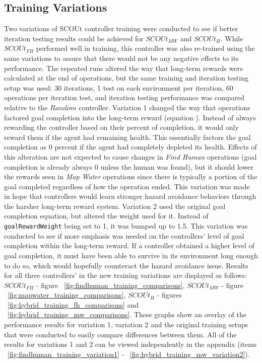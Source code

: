 \subsection{Training Variations} \label{subsec:training_variations}
Two variations of SCOUt controller training were conducted to see if better iteration testing results could be achieved for $SCOUt_{MW}$ and $SCOUt_{H}$.
While $SCOUt_{FH}$ performed well in training, this controller was also re-trained using the same variations to assure that there would not be any negative effects to its performance.
The repeated runs altered the way that long-term rewards were calculated at the end of operations, but the same training and iteration testing setup was used: 30 iterations, 1 test on each environment per iteration, 60 operations per iteration test, and iteration testing performance was compared relative to the $Random$ controller.
Variation 1 changed the way that operations factored goal completion into the long-term reward (equation ).
Instead of always rewarding the controller based on their percent of completion, it would only reward them if the agent had remaining health.
This essentially factors the goal completion as 0 percent if the agent had completely depleted its health.
Effects of this alteration are not expected to cause changes in \textit{Find Human} operations (goal completion is already always 0 unless the human was found), but it should lower the rewards seen in \textit{Map Water} operations since there is typically a portion of the goal completed regardless of how the operation ended.
This variation was made in hope that controllers would learn stronger hazard avoidance behaviors through the harsher long-term reward system.
Variation 2 used the original goal completion equation, but altered the weight used for it.
Instead of \texttt{goalRewardWeight} being set to 1, it was bumped up to 1.5.
This variation was conducted to see if more emphasis was needed on the controllers' level of goal completion within the long-term reward.
If a controller obtained a higher level of goal completion, it must have been able to survive in its environment long enough to do so, which would hopefully counteract the hazard avoidance issue.
Results for all three controllers' in the new training variations are displayed as follows: $SCOUt_{FH}$ - figure ~\ref{fig:findhuman_training_comparisons}, $SCOUt_{MW}$ - figure ~\ref{fig:mapwater_training_comparisons}, $SCOUt_{H}$ - figures ~\ref{fig:hybrid_training_fh_comparisons} and ~\ref{fig:hybrid_training_mw_comparisons}.
These graphs show an overlay of the performance results for variation 1, variation 2 and the original training setups that were conducted to easily compare differences between them.
All of the results for variations 1 and 2 can be viewed independently in the appendix (items ~\ref{fig:findhuman_training_variation1} - ~\ref{fig:hybrid_training_mw_variation2}).

